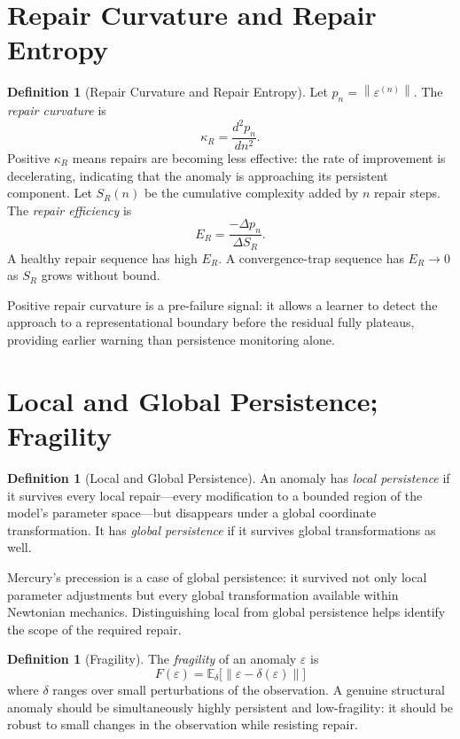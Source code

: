 \documentclass[12pt,oneside]{book}
\theoremstyle{plain}
\theoremstyle{definition}
\newtheorem{definition}[theorem]{Definition}
\theoremstyle{remark}
\newcommand{\eps}{\varepsilon}
\newcommand{\norm}[1]{\left\lVert #1 \right\rVert}
\newcommand{\1}{\mathbf{1}}
\begin{document}
\section{Repair Curvature and Repair Entropy}

\begin{definition}[Repair Curvature and Repair Entropy]
Let $p_n = \norm{\eps^{(n)}}$. The \emph{repair curvature} is
\[
\kappa_R = \frac{d^2 p_n}{dn^2}.
\]
Positive $\kappa_R$ means repairs are becoming less effective: the rate of improvement is decelerating, indicating that the anomaly is approaching its persistent component. Let $S_R(n)$ be the cumulative complexity added by $n$ repair steps. The \emph{repair efficiency} is
\[
E_R = \frac{-\Delta p_n}{\Delta S_R}.
\]
A healthy repair sequence has high $E_R$. A convergence-trap sequence has $E_R \to 0$ as $S_R$ grows without bound.
\end{definition}

Positive repair curvature is a pre-failure signal: it allows a learner to detect the approach to a representational boundary before the residual fully plateaus, providing earlier warning than persistence monitoring alone.

\section{Local and Global Persistence; Fragility}

\begin{definition}[Local and Global Persistence]
An anomaly has \emph{local persistence} if it survives every local repair---every modification to a bounded region of the model's parameter space---but disappears under a global coordinate transformation. It has \emph{global persistence} if it survives global transformations as well.
\end{definition}

Mercury's precession is a case of global persistence: it survived not only local parameter adjustments but every global transformation available within Newtonian mechanics. Distinguishing local from global persistence helps identify the scope of the required repair.

\begin{definition}[Fragility]
The \emph{fragility} of an anomaly $\eps$ is
\[
F(\eps) = \mathbb{E}_\delta\bigl[\norm{\eps - \delta(\eps)}\bigr]
\]
where $\delta$ ranges over small perturbations of the observation. A genuine structural anomaly should be simultaneously highly persistent and low-fragility: it should be robust to small changes in the observation while resisting repair.
\end{definition}
\end{document}
